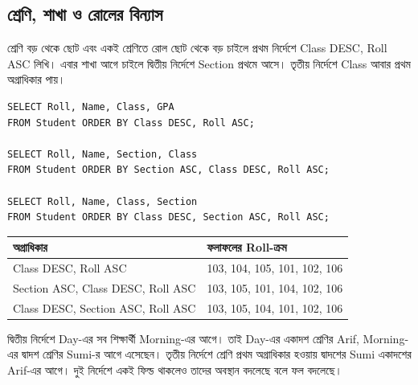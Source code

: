 \subsection{শ্রেণি, শাখা ও রোলের বিন্যাস}
শ্রেণি বড় থেকে ছোট এবং একই শ্রেণিতে রোল ছোট থেকে বড় চাইলে প্রথম নির্দেশে Class DESC, Roll ASC লিখি। এবার শাখা আগে চাইলে দ্বিতীয় নির্দেশে Section প্রথমে আসে। তৃতীয় নির্দেশে Class আবার প্রথম অগ্রাধিকার পায়।
\begin{verbatim}
SELECT Roll, Name, Class, GPA
FROM Student ORDER BY Class DESC, Roll ASC;

SELECT Roll, Name, Section, Class
FROM Student ORDER BY Section ASC, Class DESC, Roll ASC;

SELECT Roll, Name, Class, Section
FROM Student ORDER BY Class DESC, Section ASC, Roll ASC;
\end{verbatim}
\begin{flushleft}\begin{minipage}{\linewidth}\raggedright\small
\begin{tabularx}{\linewidth}{|X|l|}\hline
অগ্রাধিকার & ফলাফলের Roll-ক্রম\\\hline
Class DESC, Roll ASC & 103, 104, 105, 101, 102, 106\\\hline
Section ASC, Class DESC, Roll ASC & 103, 105, 101, 104, 102, 106\\\hline
Class DESC, Section ASC, Roll ASC & 103, 105, 104, 101, 102, 106\\\hline
\end{tabularx}
\end{minipage}\end{flushleft}
দ্বিতীয় নির্দেশে Day-এর সব শিক্ষার্থী Morning-এর আগে। তাই Day-এর একাদশ শ্রেণির Arif, Morning-এর দ্বাদশ শ্রেণির Sumi-র আগে এসেছেন। তৃতীয় নির্দেশে শ্রেণি প্রথম অগ্রাধিকার হওয়ায় দ্বাদশের Sumi একাদশের Arif-এর আগে। দুই নির্দেশে একই ফিল্ড থাকলেও তাদের অবস্থান বদলেছে বলে ফল বদলেছে।

